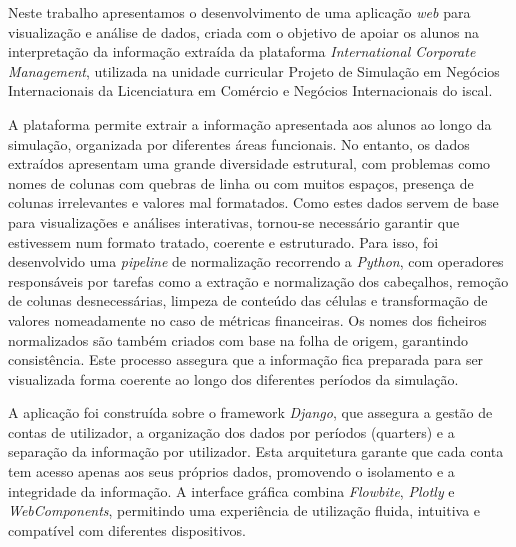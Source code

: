 




Neste trabalho apresentamos o desenvolvimento de uma aplicação \textit{web} para visualização e análise de dados, criada com o objetivo de apoiar os alunos na interpretação da informação extraída da plataforma \textit{International Corporate Management}, utilizada na unidade curricular Projeto de Simulação em Negócios Internacionais da Licenciatura em Comércio e Negócios Internacionais do \gls{iscal}.

A plataforma permite extrair a informação apresentada aos alunos ao longo da simulação, organizada por diferentes áreas funcionais. No entanto, os dados extraídos apresentam uma grande diversidade estrutural, com problemas como nomes de colunas com quebras de linha ou com muitos espaços, presença de colunas irrelevantes e valores mal formatados. Como estes dados servem de base para visualizações e análises interativas, tornou-se necessário garantir que estivessem num formato tratado, coerente e estruturado. Para isso, foi desenvolvido uma \textit{pipeline} de normalização recorrendo a \textit{Python}, com operadores responsáveis por tarefas como a extração e normalização dos cabeçalhos, remoção de colunas desnecessárias, limpeza de conteúdo das células e transformação de valores nomeadamente no caso de métricas financeiras. Os nomes dos ficheiros normalizados são também criados com base na folha de origem, garantindo consistência. Este processo assegura que a informação fica preparada para ser visualizada forma coerente ao longo dos diferentes períodos da simulação.

A aplicação foi construída sobre o framework \textit{Django}, que assegura a gestão de contas de utilizador, a organização dos dados por períodos (quarters) e a separação da informação por utilizador. Esta arquitetura garante que cada conta tem acesso apenas aos seus próprios dados, promovendo o isolamento e a integridade da informação. A interface gráfica combina \textit{Flowbite}, \textit{Plotly} e \textit{WebComponents}, permitindo uma experiência de utilização fluida, intuitiva e compatível com diferentes dispositivos.

